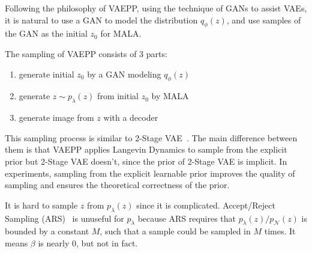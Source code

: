 Following the philosophy of VAEPP, \IE using the technique of GANs to assist VAEs, it is natural to use a GAN to model the distribution $q_\phi(z)$, and use samples of the GAN as the initial $z_0$ for MALA. 

The sampling of VAEPP consists of 3 parts: 
\begin{enumerate}
	\item generate initial $z_0$ by a GAN modeling $q_\phi(z)$
	\item generate $z \sim p_\lambda(z)$ from initial $z_0$ by MALA
	\item generate image from $z$ with a decoder
\end{enumerate}

This sampling process is similar to 2-Stage VAE~\cite{dai2019diagnosing}. The main difference between them is that VAEPP applies Langevin Dynamics to sample from the explicit prior but 2-Stage VAE doesn't, since the prior of 2-Stage VAE is implicit. In experiments, sampling from the explicit learnable prior improves the quality of sampling and ensures the theoretical correctness of the prior. 

It is hard to sample $z$ from $p_\lambda(z)$ since it is complicated. Accept/Reject Sampling (ARS)~\cite{bauer2019resampled} is unuseful for $p_\lambda$ because ARS requires that $p_\lambda(z) / p_\mathcal{N}(z)$ is bounded by a constant $M$, such that a sample could be sampled in $M$ times. It means $\beta$ is nearly 0, but not in fact.
 
 